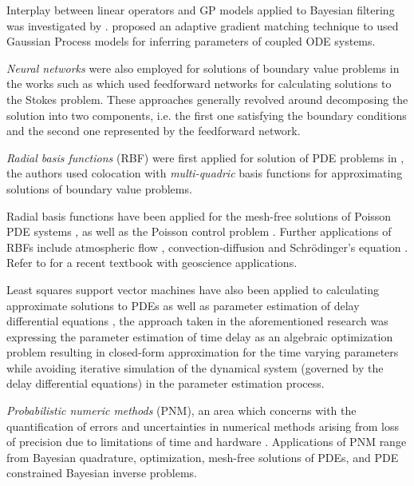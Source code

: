Interplay between linear operators and GP models applied to Bayesian filtering was investigated by 
\citet{Sarkka2011}. \citet{pmlr-v31-dondelinger13a} proposed an adaptive gradient matching 
technique to used Gaussian Process models for inferring parameters of coupled ODE systems.

\emph{Neural networks} were also employed for solutions of boundary value problems in the 
works such as \citet{Lagaris,Aarts2001,TSOULOS20092385,Baymani2011} which used feedforward networks 
for calculating solutions to the Stokes problem. These approaches generally revolved around 
decomposing the solution into two components, i.e. the first one satisfying the boundary conditions 
and the second one represented by the feedforward network.

\emph{Radial basis functions} (RBF) were first applied for solution of PDE problems in 
\citet{KANSA1990147}, the authors used colocation with \emph{multi-quadric} basis functions for 
approximating solutions of boundary value problems.

Radial basis functions have been applied for the mesh-free solutions of Poisson PDE systems 
\citep{AMINATAEI20082887,DUAN200866,DUAN2006394,CNM:CNM419}, as well as the Poisson control problem 
\citep{Pearson2013}. Further applications of RBFs include atmospheric flow 
\citep{Tillenius2015406}, convection-diffusion \citep{Safdari-Vaighani2015} and Schr\"{o}dinger's 
equation \citep{doi:10.1137/120893975}. Refer to \citet{fornberg2015} for a recent textbook with 
geoscience applications.

Least squares support vector machines have also been applied to calculating approximate solutions 
to PDEs \citep{MEHRKANOON2015105,MEHRKANOON20122502} as well as parameter estimation of delay 
differential equations \citep{MEHRKANOON2014830}, the approach taken in the aforementioned research 
\citep{MEHRKANOON2014830} was expressing the parameter estimation of time delay as an algebraic 
optimization problem resulting in closed-form approximation for the time varying parameters while 
avoiding iterative simulation of the dynamical system 
(governed by the delay differential equations) in the parameter estimation process.

\emph{Probabilistic numeric methods} (PNM), an area which concerns with the quantification of 
errors and uncertainties in numerical methods arising from loss of precision due to limitations of 
time and hardware \citep{hennig2015probabilistic}. Applications of PNM range from Bayesian 
quadrature, optimization, mesh-free solutions of PDEs, and PDE constrained Bayesian inverse 
problems. 

